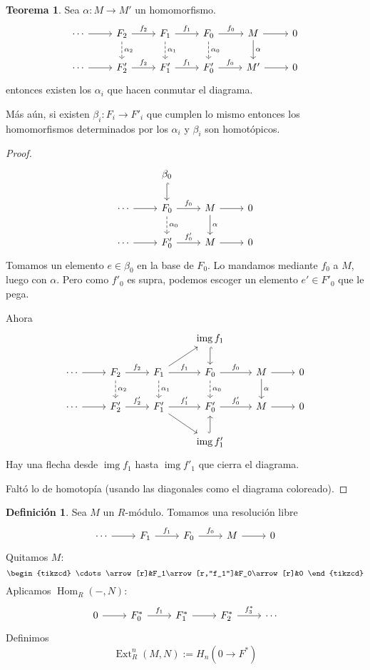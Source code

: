 \documentclass[spanish]{book}
\theoremstyle{definition}
\newtheorem*{defn}{Definición}
\newtheorem*{teo}{Teorema}
\DeclareMathOperator{\img}{img}
\DeclareMathOperator{\Hom}{Hom}
\DeclareMathOperator{\Ext}{Ext}
\begin{document}
\begin{teo}
	Sea $\alpha:M\to M'$ un homomorfismo.
	\[\begin{tikzcd}
		\cdots\arrow[r]&F_2\arrow[r,"f_2"]\arrow[d,dashed,"\alpha_2"]&F_1\arrow[r,"f_1"]\arrow[d,dashed,"\alpha_1"]&F_0\arrow[d,dashed,"\alpha_0"]\arrow[r,"f_0"]&M\arrow[d,"\alpha"]\arrow[r]&0\\
		\cdots\arrow[r]&F'_2\arrow[r,"f_2"]&F'_1\arrow[r,"f_1"]&F'_0\arrow[r,"f_0"]&M'\arrow[r]&0
	\end{tikzcd}\]
	entonces existen los $\alpha_i$ que hacen conmutar el diagrama.
	
	Más aún, si existen $\beta_i:F_i\to F'_i$ que cumplen lo mismo entonces los homomorfismos determinados por los $\alpha_i$ y $\beta_i$ son homotópicos.
\end{teo}
\begin{proof}
	\[\begin{tikzcd}
		&\beta_0\arrow[d,hook,]&&\\	
		\cdots\arrow[r]&F_0\arrow[d,dashed,"\alpha_0"]\arrow[r,"f_0"]&M\arrow[d,"\alpha"]\arrow[r]&0\\
		\cdots\arrow[r]&F'_0\arrow[r,"f'_0"]&M\arrow[r]&0
	\end{tikzcd}\]
	Tomamos un elemento $e\in \beta_0$ en la base de $F_0$. Lo mandamos mediante $f_0$ a $M$, luego con $\alpha$. Pero como $f'_0$ es supra, podemos escoger un elemento $e'\in F'_0$ que le pega.
	
	Ahora
	\[\begin{tikzcd}
		&&&\img f_1\arrow[d,hook,]&&\\	
		\cdots\arrow[r]&F_2\arrow[r,"f_2"]\arrow[d,dashed,"\alpha_2"]&F_1\arrow[ur]\arrow[r,"f_1"]\arrow[d,dashed,"\alpha_1"]&F_0\arrow[d,dashed,"\alpha_0"]\arrow[r,"f_0"]&M\arrow[d,"\alpha"]\arrow[r]&0\\
		\cdots\arrow[r]&F'_2\arrow[r,"f'_2"]&F'_1\arrow[dr]\arrow[r,"f'_1"]&F'_0\arrow[r,"f'_0"]&M\arrow[r]&0\\
		&&&\img f'_1\arrow[u,hook,]&&
	\end{tikzcd}\]
	Hay una flecha desde $\img f_1$ hasta $\img f'_1$ que cierra el diagrama.
	
	Faltó lo de homotopía (usando las diagonales como el diagrama coloreado).
\end{proof}
\begin{defn}
	Sea $M$ un $R$-módulo. Tomamos una resolución libre
	\[\begin{tikzcd}
		\cdots\arrow[r]&F_1\arrow[r,"f_1"]&F_0\arrow[r,"f_0"]&M\arrow[r]&0
	\end{tikzcd}\]
	Quitamos $M$:
	\[\begin{tikzcd}
		\cdots\arrow[r]&F_1\arrow[r,"f_1"]&F_0\arrow[r]&0
	\end{tikzcd}\]
	Aplicamos $\Hom_R(-,N)$:
	\[\begin{tikzcd}
		0\arrow[r]&F_0^*\arrow[r,"f_1"]&F_1^*\arrow[r]&F_2^*\arrow[r,"f_3^*"]&\cdots
	\end{tikzcd}\]
	Definimos
	\[\Ext^n_R(M,N):=H_n(0\to F^*)\]
\end{defn}
\end{document}
